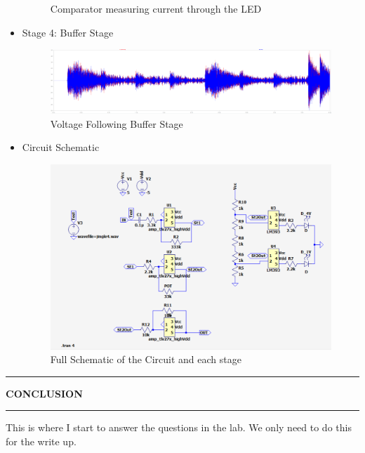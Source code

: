 \documentclass{article}
\begin{document}
\begin{itemize}
\begin{figure}[H]
        \caption{Comparator measuring current through the LED}
    \end{figure}
    \item Stage 4: Buffer Stage 
    \begin{figure}[H]
        \centering
        \includegraphics[width=1\textwidth]{buffstage.png}
        \caption{Voltage Following Buffer Stage}
    \end{figure}
    \item Circuit Schematic
    \begin{figure}[H]
        \centering
        \includegraphics[width=1\textwidth]{circuitdiagram.png}
        \caption{Full Schematic of the Circuit and each stage}
    \end{figure}
\end{itemize}

\begin{center}
    \hrule
    \vspace{0.2cm}
    \textbf{\large CONCLUSION}
    \vspace{0.2cm}
    \hrule
\end{center}

This is where I start to answer the questions in the lab. We only need to do this for the write up.
\end{document}
